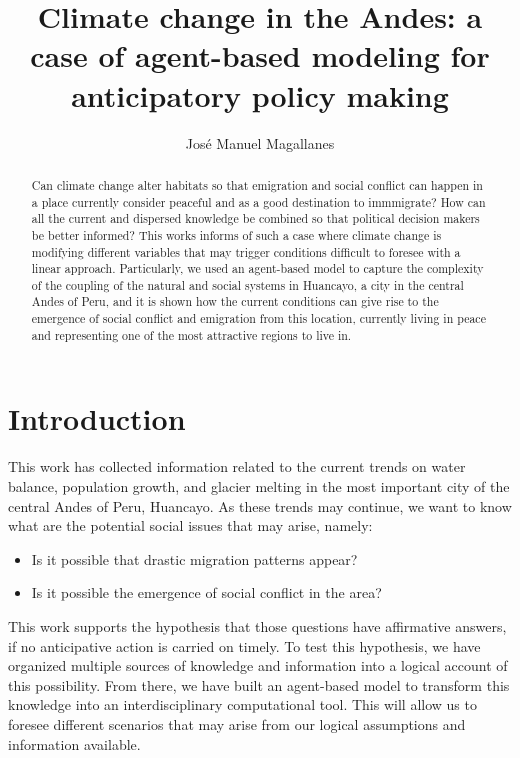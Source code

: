\documentclass{article}
\title{Climate change in the Andes: a case of agent-based modeling for anticipatory policy making}
\author{\normalsize Jos\'{e} Manuel Magallanes}
\affil{\small eScience Institute and Evans School of Public Policy\\
University of Washington\\
\url{magajm@uw.edu}}
\affil{\small Department of Social Sciences\\
Pontificia Universidad Catolica del Peru\\
\url{jmagallanes@pucp.edu.pe}}
\affil{\small  Center for Social Complexity\\
George Mason University \\
\url{jmagalla@gmu.edu}}
\begin{document}


\maketitle

\begin{abstract}
Can climate change alter habitats so that emigration and social conflict can happen in a place currently consider peaceful and as a good destination to immmigrate? How can all the current and dispersed knowledge be combined so that political decision makers be better informed? This works informs of such a case where climate change is modifying different variables that may trigger conditions difficult to foresee with a linear approach. Particularly, we used an agent-based model to capture the complexity of the coupling of the natural and social systems in Huancayo, a city in the central Andes of Peru, and it is shown how the current conditions can give rise to the emergence of social conflict and emigration from this location, currently living in peace and representing one of the most attractive regions to live in.

\end{abstract}


\section{Introduction}

This work has collected information related to the current trends on water balance, population growth, and glacier melting in the most important city of the central Andes of Peru, Huancayo. As these trends may continue, we want to know what are the potential social issues that may arise, namely:
\begin{itemize}
\item Is it possible that drastic migration patterns appear?
\item Is it possible the emergence of social conflict in the area?
\end{itemize}

This work supports the hypothesis that those questions have affirmative answers, if no anticipative action is carried on timely. To test this hypothesis, we have organized multiple sources of knowledge and information into  a logical account of this possibility. From there, we have built an agent-based model to transform this knowledge into an interdisciplinary computational tool. This will allow us to foresee different scenarios that may arise from our logical assumptions and information available. 
\end{document}
